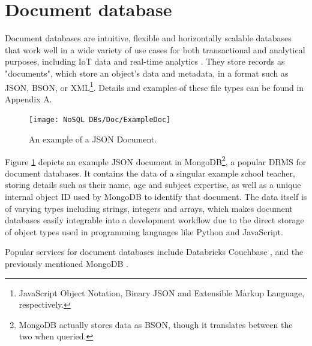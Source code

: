 \documentclass[12pt]{report}
\newcommand{\para}{\vspace{7pt}\noindent}
\begin{document}

\section{Document database}\label{sec:DocDBs}
Document databases are intuitive, flexible and horizontally scalable databases that work well in a wide variety of use cases
for both transactional and analytical purposes, including IoT data and real-time analytics \autocite{mongodbDocumentDatabaseNoSQL}.
They store records as "documents", which store an object's data and metadata, in a format such as JSON, BSON, or XML\footnote{JavaScript Object Notation, Binary JSON and Extensible Markup Language, respectively.}. Details and examples of these file types can be found in Appendix A.


\begin{figure}[H]
    \centering
    \texttt{[image: NoSQL DBs/Doc/ExampleDoc]}
    \caption{An example of a JSON Document.\label{fig:ExampleDoc}}
\end{figure}

\noindent Figure \ref{fig:ExampleDoc} depicts an example JSON document in MongoDB\footnote{MongoDB actually stores data as BSON, though it translates between the two when queried.}, a popular DBMS
for document databases. It contains the data of a singular example school teacher, storing details such as their name, age and subject expertise, as well as a unique internal object ID used by MongoDB to identify that document. The data itself is of varying types including 
strings, integers and arrays, which makes document databases easily integrable into a development workflow due to the direct 
storage of object types used in programming languages like Python and JavaScript.


\para Popular services for document databases include Databricks \autocite{databricksDataAICompany2023} Couchbase \autocite{couchbaseCouchbaseBestFree}, and the previously mentioned MongoDB \autocite{mongodbDocumentDatabaseNoSQL}.
\end{document}
